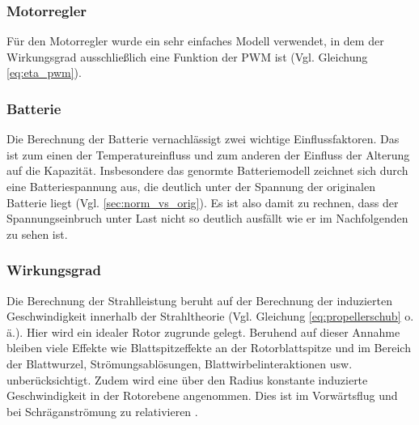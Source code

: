 \subsubsection{Motorregler}
Für den Motorregler wurde ein sehr einfaches Modell verwendet, in dem der Wirkungsgrad ausschließlich eine Funktion der PWM ist (Vgl. Gleichung \eqref{eq:eta_pwm}).

\subsubsection{Batterie}
Die Berechnung der Batterie vernachlässigt zwei wichtige Einflussfaktoren. Das ist zum einen der Temperatureinfluss und zum anderen der Einfluss der Alterung auf die Kapazität. Insbesondere das genormte Batteriemodell zeichnet sich durch eine Batteriespannung aus, die deutlich unter der Spannung der originalen Batterie liegt (Vgl. \ref{sec:norm_vs_orig}). Es ist also damit zu rechnen, dass der Spannungseinbruch unter Last nicht so deutlich ausfällt wie er im Nachfolgenden zu sehen ist.\\


\subsubsection{Wirkungsgrad}
Die Berechnung der Strahlleistung beruht auf der Berechnung der induzierten Geschwindigkeit innerhalb der Strahltheorie (Vgl. Gleichung \eqref{eq:propellerschub} o. ä.). Hier wird ein idealer Rotor zugrunde gelegt.
Beruhend auf dieser Annahme bleiben viele Effekte wie Blattspitzeffekte an der Rotorblattspitze und im Bereich der Blattwurzel, Strömungsablösungen, Blattwirbelinteraktionen usw. unberücksichtigt.  Zudem wird eine über den Radius konstante induzierte Geschwindigkeit in der Rotorebene angenommen. Dies ist im Vorwärtsflug und bei Schräganströmung zu relativieren \cite[S.226]{Wall.2015}.

